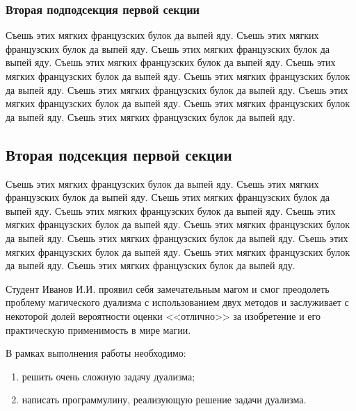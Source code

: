 \documentclass{./../class/UIR}
\begin{document}
        \subsubsection{Вторая подподсекция первой секции}
        Съешь этих мягких французских булок да выпей яду. Съешь этих мягких французских булок да выпей яду. Съешь этих мягких французских булок да выпей яду. Съешь этих мягких французских булок да выпей яду. Съешь этих мягких французских булок да выпей яду. Съешь этих мягких французских булок да выпей яду. Съешь этих мягких французских булок да выпей яду. Съешь этих мягких французских булок да выпей яду. Съешь этих мягких французских булок да выпей яду. Съешь этих мягких французских булок да выпей яду.
        
        
    \subsection{Вторая подсекция первой секции}
    Съешь этих мягких французских булок да выпей яду. Съешь этих мягких французских булок да выпей яду. Съешь этих мягких французских булок да выпей яду. Съешь этих мягких французских булок да выпей яду. Съешь этих мягких французских булок да выпей яду. Съешь этих мягких французских булок да выпей яду. Съешь этих мягких французских булок да выпей яду. Съешь этих мягких французских булок да выпей яду. Съешь этих мягких французских булок да выпей яду. Съешь этих мягких французских булок да выпей яду.


\ReviewOfSupervisorTemplate

\begin{ReviewOfSupervisor}
Студент Иванов И.И. проявил себя замечательным магом и смог преодолеть проблему магического дуализма с использованием двух методов и заслуживает с некоторой долей вероятности оценки <<отлично>> за изобретение и его практическую применимость в мире магии.
\end{ReviewOfSupervisor}

\TaskOfStudentTemplate

\begin{TaskOfStudent}
В рамках выполнения работы необходимо: 
\begin{enumerate}
  \item решить очень сложную задачу дуализма;
  \item написать программулину, реализующую решение задачи дуализма.
\end{enumerate}
\end{TaskOfStudent}
\end{document}
